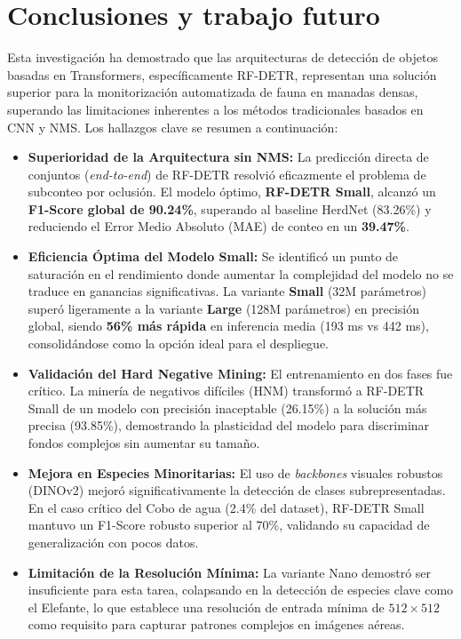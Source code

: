 \section{Conclusiones y trabajo futuro}

Esta investigación ha demostrado que las arquitecturas de detección de objetos basadas en Transformers, específicamente RF-DETR, representan una solución superior para la monitorización automatizada de fauna en manadas densas, superando las limitaciones inherentes a los métodos tradicionales basados en CNN y NMS. Los hallazgos clave se resumen a continuación:

\begin{itemize}
    \item \textbf{Superioridad de la Arquitectura sin NMS:} La predicción directa de conjuntos (\textit{end-to-end}) de RF-DETR resolvió eficazmente el problema de subconteo por oclusión. El modelo óptimo, \textbf{RF-DETR Small}, alcanzó un \textbf{F1-Score global de 90.24\%}, superando al baseline HerdNet (83.26\%) y reduciendo el Error Medio Absoluto (MAE) de conteo en un \textbf{39.47\%}.

    \item \textbf{Eficiencia Óptima del Modelo Small:} Se identificó un punto de saturación en el rendimiento donde aumentar la complejidad del modelo no se traduce en ganancias significativas. La variante \textbf{Small} (32M parámetros) superó ligeramente a la variante \textbf{Large} (128M parámetros) en precisión global, siendo \textbf{56\% más rápida} en inferencia media (193 ms vs 442 ms), consolidándose como la opción ideal para el despliegue.

    \item \textbf{Validación del Hard Negative Mining:} El entrenamiento en dos fases fue crítico. La minería de negativos difíciles (HNM) transformó a RF-DETR Small de un modelo con precisión inaceptable (26.15\%) a la solución más precisa (93.85\%), demostrando la plasticidad del modelo para discriminar fondos complejos sin aumentar su tamaño.

    \item \textbf{Mejora en Especies Minoritarias:} El uso de \textit{backbones} visuales robustos (DINOv2) mejoró significativamente la detección de clases subrepresentadas. En el caso crítico del Cobo de agua (2.4\% del dataset), RF-DETR Small mantuvo un F1-Score robusto superior al 70\%, validando su capacidad de generalización con pocos datos.

    \item \textbf{Limitación de la Resolución Mínima:} La variante Nano demostró ser insuficiente para esta tarea, colapsando en la detección de especies clave como el Elefante, lo que establece una resolución de entrada mínima de $512 \times 512$ como requisito para capturar patrones complejos en imágenes aéreas.\newline
\end{itemize}

